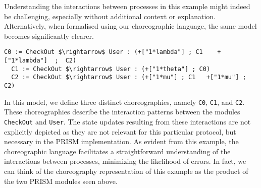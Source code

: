 Understanding the interactions between processes in this example might
indeed be challenging, especially without additional context or
explanation.  Alternatively, when formalised using our choreographic
language, the same model becomes significantly clearer.
\begin{lstlisting}[style=chor-color,% caption={Example of Listing \ref{example1} in our choreographic language},captionpos=b,
  frame=none, label={example2}]
  C0 := CheckOut $\rightarrow$ User : (+["1*lambda"] ; C1	 +["1*lambda"]  ;  C2)
  C1 := CheckOut $\rightarrow$ User : (+["1*theta"] ; C0)  
  C2 := CheckOut $\rightarrow$ User : (+["1*mu"] ; C1   +["1*mu"] ;  C2)
\end{lstlisting}
In this model, we define three distinct choreographies, namely
\texttt{C0}, \texttt{C1}, and \texttt{C2}. These choreographies
describe the interaction patterns between the modules \texttt{CheckOut}
and \texttt{User}. The state updates resulting from these
interactions are not explicitly depicted as they are not relevant for
this particular protocol, but necessary in the PRISM implementation.
%
%
As evident from this example, the choreographic language facilitates a
straightforward understanding of the interactions between processes,
minimizing the likelihood of errors. In fact, we can think of the
choreography representation of this example as the product of the two
PRISM modules seen above.




